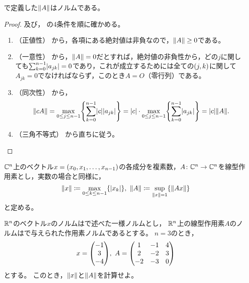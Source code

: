 \documentclass[b5paper,oneside,openany]{ltjsbook} %
\begin{document}
\begin{prop}
    で定義した$\norm{A}$はノルムである。
    \begin{proof}
        及び，
        の4条件を順に確かめる。
        \begin{enumerate}[label=(\roman*)]
            \item （正値性）
            から，各項にある絶対値は非負なので，$\norm{A} \geq 0$である。

            \item （一意性）
            から，$\norm{A}=0$だとすれば，絶対値の非負性から，どの$j$に関しても$\sum_{k=0}^{n-1}\abs{a_{jk}}=0$であり，これが成立するためには全ての$\pare{j,k}$に関して$A_{jk}=0$でなければならず，このとき$A=O$（零行列）である。

            \item （同次性）
            から，
            \begin{equation}
                \norm{cA}=\max_{0\leq j\leq n-1} \bra{\sum_{k=0}^{n-1} \abs{c}\abs{a_{jk}}}=\abs{c}\cdot \max_{0\leq j\leq n-1} \bra{\sum_{k=0}^{n-1} \abs{a_{jk}}}=\abs{c}\norm{A}.
            \end{equation}

            \item （三角不等式）
            から直ちに従う。
        \end{enumerate}
    \end{proof}
\end{prop}

\begin{defi}
    $\mathbb{C}^n$上のベクトル$x=\pare{x_0,x_1,\dots,x_{n-1}}$の各成分を複素数，$A\colon\mathbb{C}^n\to\mathbb{C}^n$を線型作用素とし，実数の場合と同様に，
    \begin{equation}
        \norm{x}\coloneqq \max_{0\leq k\leq n-1}\bra{\abs{x_k}},\
        \norm{A}\coloneqq \sup_{\norm{x}=1}\bra{\norm{Ax}}
    \end{equation}
    と定める。
\end{defi}

\begin{prop}
    
\end{prop}

\begin{prob}
    $\mathbb{R}^n$のベクトル$x$のノルムはで述べた一様ノルムとし，
    $\mathbb{R}^n$上の線型作用素$A$のノルムはで与えられた作用素ノルムであるとする。
    $n=3$のとき，
    \begin{equation}
        x=\vctr{-1\\3\\-4},\
        A=\pmat{1 & -1 & 4\\
            2 & -2 & 3\\
            -2 & -3 & 0
            }
    \end{equation}
    とする。
    このとき，$\norm{x}$と$\norm{A}$を計算せよ。
\end{prob}
\end{document}
